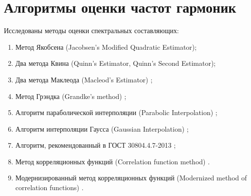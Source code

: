 \section{Алгоритмы оценки частот гармоник} \label{sec:ch2/sec5}
Исследованы методы оценки спектральных составляющих:
\begin{enumerate}
\item	Метод Якобсена (Jacobsen's Modified Quadratic Estimator)\cite{4205098, jacobsen1994local, jacobsen2007fast, ericjacobsen_cite};
\item	Два метода Квина (Quinn's Estimator, Quinn's Second Estimator)\cite{558515, 295186, 330402};
\item	Два метода Маклеода (Macleod's Estimator) \cite{651200, 1055282};
\item	Метод Грэндка (Grandke's method) \cite{4315077};
\item	Алгоритм параболической интерполяции (Parabolic Interpolation) \cite{Konopatskiy_2020, LACHANCE1991143, gasior2004improving, 7818824};
\item	Алгоритм интерполяции Гаусса (Gaussian Interpolation) \cite{gasior2004improving, gu2005leaf, gilboa2014image};
\item	Алгоритм, рекомендованный в ГОСТ 30804.4.7-2013 \cite{GOST30804.4.7-2013};
\item	Метод корреляционных функций (Correlation function method) \cite{Altman2012definition, Altman2012promotion, Altman2012improvement, WANG20175}.
\item Модернизированный метод корреляционных функций (Modernized method of correlation functions) \cite{Altman2012promotion, Elizarov2016analysis, Increase_Accuracy_Yelizarov2014}.
\end{enumerate}



